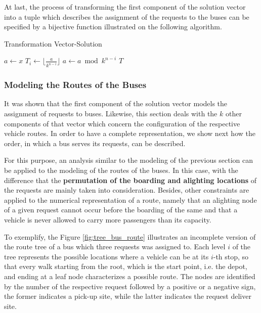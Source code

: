 \documentclass[tuberlin,cic,tc,openright,english,noabntcite,oneside]{iiufrgs}
\begin{document}
At last, the process of transforming the first component of the solution vector into a tuple which describes the assignment of the requests to the buses can be specified by a bijective function illustrated on the following algorithm.
\begin{algorithm}[H]
\caption{Transformation Vector-Solution}
\begin{algorithmic}
\State $a \gets x$
	\State $\displaystyle T_{i} \gets \lfloor \frac{a}{k^{n-i}} \rfloor$
	\State $a \gets a \bmod k^{n-i}$
\EndFor
\State \Return $T$
\EndFunction
\end{algorithmic}
\end{algorithm}

\subsubsection{Modeling the Routes of the Buses}
It was shown that the first component of the solution vector models the assignment of requests to buses. Likewise, this section deals with the $k$ other components of that vector which concern the configuration of the respective vehicle routes. In order to have a complete representation, we show next how the order, in which a bus serves its requests, can be described.

For this purpose, an analysis similar to the modeling of the previous section can be applied to the modeling of the routes of the buses. In this case, with the difference that the \textbf{permutation of the boarding and alighting locations} of the requests are mainly taken into consideration. Besides, other constraints are applied to the numerical representation of a route, namely that an alighting node of a given request cannot occur before the boarding of the same and that a vehicle is never allowed to carry more passengers than its capacity.

To exemplify, the Figure \ref{fig:tree_bus_route} illustrates an incomplete version of the route tree of a bus which three requests was assigned to. Each level $i$ of the tree represents the possible locations where a vehicle can be at its $i$-th stop, so that every walk starting from the root, which is the start point, i.e. the depot, and ending at a leaf node characterizes a possible route. The nodes are identified by the number of the respective request followed by a positive or a negative sign, the former indicates a pick-up site, while the latter indicates the request deliver site.
\end{document}
